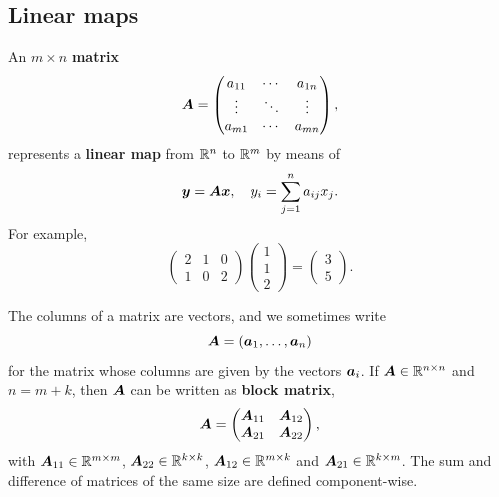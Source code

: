 \documentclass[11pt,a4paper]{memoir}
\begin{document}
\subsection{Linear maps}
An $m\times n$ \textbf{matrix} 
\begin{equation*}
\bm{A} = \begin{pmatrix} a_{11} & \cdots & a_{1n}\\
                    \vdots & \ddots & \vdots\\
                    a_{m1} & \cdots & a_{mn}
\end{pmatrix},
\end{equation*}
represents a \textbf{linear map} from $\mathbb{R}^n$ to $\mathbb{R}^m$ by means of
\begin{equation*}
\bm{y}= \bm{A}\bm{x}, \quad y_i = \sum_{j=1}^n a_{ij}x_j. 
\end{equation*}
For example,
\begin{equation*}
\begin{pmatrix}
2 & 1 & 0\\
1 & 0 & 2
\end{pmatrix}\begin{pmatrix}
1\\1\\2
\end{pmatrix} = 
\begin{pmatrix}
3\\5
\end{pmatrix}.
\end{equation*}

The columns of a matrix are vectors, and we sometimes write
\begin{equation*}
 \bm{A} = (\bm{a}_1,\dots,\bm{a}_n)
\end{equation*}
for the matrix whose columns are given by the vectors $\bm{a}_i$. 
If $\bm{A}\in \mathbb{R}^{n\times n}$ and $n=m+k$, then $\bm{A}$ can be written as \textbf{block matrix},
\begin{equation*}
 \bm{A} = \begin{pmatrix} 
  \bm{A}_{11} & \bm{A}_{12}\\
  \bm{A}_{21} & \bm{A}_{22}
 \end{pmatrix},
\end{equation*}
with $\bm{A}_{11}\in \mathbb{R}^{m\times m}$, $\bm{A}_{22}\in \mathbb{R}^{k\times k}$, $\bm{A}_{12}\in \mathbb{R}^{m\times k}$ and $\bm{A}_{21}\in \mathbb{R}^{k\times m}$. The sum and difference of matrices of the same size are defined component-wise. 
\end{document}
